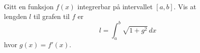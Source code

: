 Gitt en funksjon $ f(x) $ integrerbar på intervallet $ [a, b] $. Vis at \\lengden $ l $ til grafen til $ f $ er
\[ l=\int_{a}^{b} \sqrt{1+g^2}\,dx \]
hvor $ g(x)=f'(x) $.

